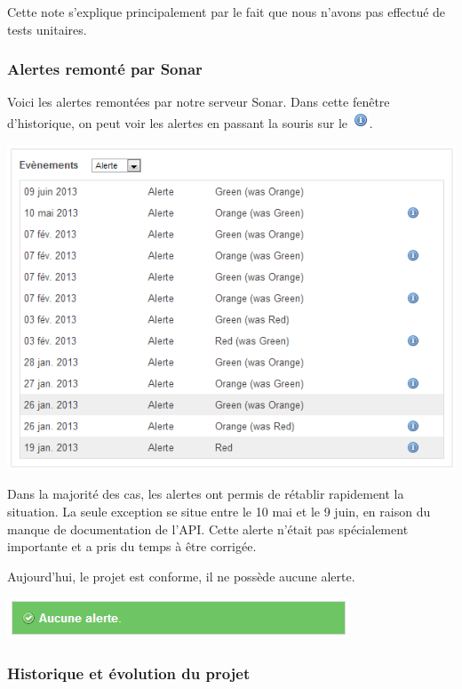 \documentclass{report}
\begin{document}
Cette note s’explique principalement par le fait que nous n’avons pas
effectué de tests unitaires.

\subsubsection{Alertes remonté par Sonar}

Voici les alertes remontées par notre serveur Sonar. Dans cette fenêtre
d’historique, on peut voir les alertes en passant la souris sur le
\includegraphics[scale=0.8]{images/info_icon}.

\includegraphics[scale=0.8]{images/alert1}

Dans la majorité des cas, les alertes ont permis de rétablir rapidement
la situation. La seule exception se situe entre le 10 mai et le 9 juin,
en raison du manque de documentation de l’API. Cette alerte n’était pas
spécialement importante et a pris du temps à être corrigée.

Aujourd’hui, le projet est conforme, il ne possède aucune alerte.

\includegraphics{images/alert2}

\subsubsection{Historique et évolution du projet}
\end{document}
